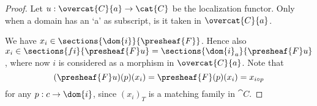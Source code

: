 
\begin{proof}
Let $u: \overcat{C}{a} \rightarrow \cat{C}$ be the localization functor.
Only when a domain has an `a' as subscript, is it taken in $\overcat{C}{a}$.

We have $x_{i} \in \sections{\dom{i}}{\presheaf{F}}$.
Hence also $x_{i} \in \sections{fi}{\presheaf{F}u} = \sections{\dom{i}_a}{\presheaf{F}u}$,
where now $i$ is considered as a morphism in $\overcat{C}{a}$.
Note that 
\[(\presheaf{F}u)(p)(x_{i}) 
	= \presheaf{F}(p)(x_{i}) =x_{i \circ p}
\]
for any $p:c \rightarrow \dom{i}$,
since $(x_{i})_T$ is a matching family in $\cat{C}$.
\end{proof}